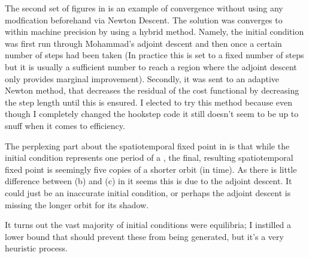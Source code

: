 \begin{description}
{\begin{description}
The second set of figures in  is an example of convergence without using any modfication beforehand
via Newton Descent. The solution was converges to within machine precision by using a hybrid method.
Namely, the initial condition was first run through Mohammad's adjoint descent and then once a certain number
of steps had been taken (In practice this is set to a fixed number of steps but it is usually a sufficient
number to reach a region where the adjoint descent only provides marginal improvement). Secondly,
it was sent to an adaptive Newton method, that decreases the residual of the cost functional
by decreasing the step length until this is ensured. I elected to try this method because even though
I completely changed the hookstep code it still doesn't seem to be up to snuff when it comes to efficiency.

The perplexing part about the spatiotemporal fixed point in  is that while the initial condition
represents one period of a \ppo, the final, resulting spatiotemporal fixed point is seemingly
five copies of a shorter orbit (in time). As there is little difference between (b) and (c) in 
it seems this is due to the adjoint descent. It could just be an inaccurate initial condition, or perhaps the
adjoint descent is missing the longer orbit for its shadow.

\item[initial conditions]

It turns out the vast majority of initial conditions were equilibria; I instilled a lower bound that should
prevent these from being generated, but it's a very heuristic process.

\end{description}
}

\end{description}
